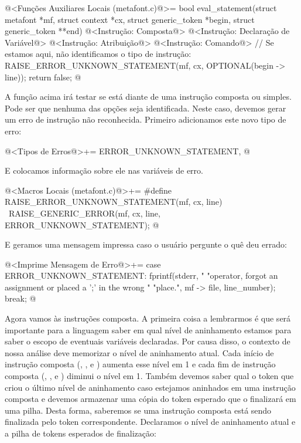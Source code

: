 \iniciocodigo
@<Funções Auxiliares Locais (metafont.c)@>=
bool eval_statement(struct metafont *mf, struct context *cx,
                    struct generic_token *begin, struct generic_token **end){
  @<Instrução: Composta@>
  @<Instrução: Declaração de Variável@>
  @<Instrução: Atribuição@>
  @<Instrução: Comando@>
  // Se estamos aqui, não identificamos o tipo de instrução:
  RAISE_ERROR_UNKNOWN_STATEMENT(mf, cx, OPTIONAL(begin -> line));
  return false;
}
@
\fimcodigo

A função acima irá testar se está diante de uma instrução composta ou
simples. Pode ser que nenhuma das opções seja identificada. Neste
caso, devemos gerar um erro de instrução não reconhecida. Primeiro
adicionamos este novo tipo de erro:

\iniciocodigo
@<Tipos de Erros@>+=
ERROR_UNKNOWN_STATEMENT,
@
\fimcodigo

E colocamos informação sobre ele nas variáveis de erro.

\iniciocodigo
@<Macros Locais (metafont.c)@>+=
#define RAISE_ERROR_UNKNOWN_STATEMENT(mf, cx, line) {\
  RAISE_GENERIC_ERROR(mf, cx, line, ERROR_UNKNOWN_STATEMENT);}
@
\fimcodigo

E geramos uma mensagem impressa caso o usuário pergunte o quê deu
errado:

\iniciocodigo
@<Imprime Mensagem de Erro@>+=
case ERROR_UNKNOWN_STATEMENT:
  fprintf(stderr, "%
          "operator, forgot an assignment or placed a ';' in the wrong "
          "place.", mf -> file, line_number);
  break;
@
\fimcodigo

Agora vamos às instruções composta. A primeira coisa a lembrarmos é
que será importante para a linguagem saber em qual nível de
aninhamento estamos para saber o escopo de eventuais variáveis
declaradas. Por causa disso, o contexto de nossa análise deve
memorizar o nível de aninhamento atual. Cada início de instrução
composta
(, , e )
aumenta esse nível em 1 e cada fim de instrução composta
(, , 
e ) diminui o nível em 1. Também devemos saber qual
o token que criou o último nível de aninhamento caso estejamos
aninhados em uma instrução composta e devemos armazenar uma cópia do
token esperado que o finalizará em uma pilha. Desta forma, saberemos
se uma instrução composta está sendo finalizada pelo token
correspondente. Declaramos o nível de aninhamento atual e a pilha de
tokens esperados de finalização:


